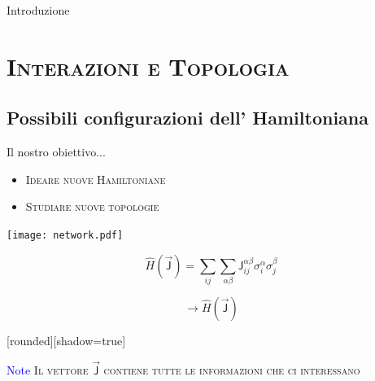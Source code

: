 \documentclass[xcolor=x11names,compress]{beamer}
\renewcommand{\(}{\begin{columns}}
\renewcommand{\)}{\end{columns}}
\newcommand{\<}[1]{\begin{column}{#1}}
\renewcommand{\>}{\end{column}}
\begin{document}
\begin{frame}{Introduzione}
\tableofcontents
\end{frame}

\section{\scshape Interazioni e Topologia}
\subsection{Possibili configurazioni dell' Hamiltoniana}
\begin{frame}{Il nostro obiettivo...}
\begin{itemize}
  \item \textsc{Ideare nuove Hamiltoniane} 
  \item \textsc{Studiare nuove topologie}
\end{itemize}

\begin{multicols}{2}
\vspace{4cm}
\texttt{[image: network.pdf]}

\normalsize{$$\hat{H} ( \vec{\textsf{J}} ) = \sum_{ij} \sum_{\alpha \beta} \textsf{J}^{\alpha \beta}_{ij} \sigma_i^{\alpha} \sigma_{j}^{\beta}$$}


\columnbreak
\hspace{2.5cm}
\Huge{$$ \rightarrow \hat{H} ( \vec{\textsf{J}} ) $$}

\vspace{-0.7cm}
\begin{minipage}{0.4\textwidth}
[rounded][shadow=true]
\begin{block}{\textcolor{blue}{Note}}
\small{\textsc{Il vettore $\vec{\textsf{J}}$ contiene tutte le informazioni che ci interessano}}
\end{block}

\end{minipage}

\end{multicols}


\end{frame}
\end{document}
